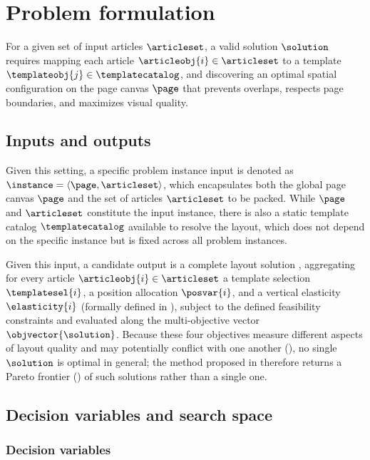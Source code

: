 \section{Problem formulation}
\label{sec:problem-formulation-pagegen}

For a given set of input articles $\articleset$, a valid solution $\solution$ requires mapping each article $\articleobj{i} \in \articleset$ to a template $\templateobj{j} \in \templatecatalog$, and discovering an optimal spatial configuration on the page canvas $\page$ that prevents overlaps, respects page boundaries, and maximizes visual quality.

\subsection{Inputs and outputs}

Given this setting, a specific problem instance input is denoted as $\instance = \langle \page, \articleset \rangle$, which encapsulates both the global page canvas $\page$ and the set of articles $\articleset$ to be packed. While $\page$ and $\articleset$ constitute the input instance, there is also a static template catalog $\templatecatalog$ available to resolve the layout, which does not depend on the specific instance but is fixed across all problem instances.

Given this input, a candidate output is a complete layout solution \solution, aggregating for every article $\articleobj{i} \in \articleset$ a template selection $\templatesel{i}$, a position allocation $\posvar{i}$, and a vertical elasticity $\elasticity{i}$ (formally defined in ), subject to the defined feasibility constraints and evaluated along the multi-objective vector $\objvector{\solution}$. Because these four objectives measure different aspects of layout quality and may potentially conflict with one another (), no single $\solution$ is optimal in general; the method proposed in  therefore returns a Pareto frontier () of such solutions rather than a single one.

\subsection{Decision variables and search space}
\subsubsection{Decision variables}
\label{sec:decision-variables}

